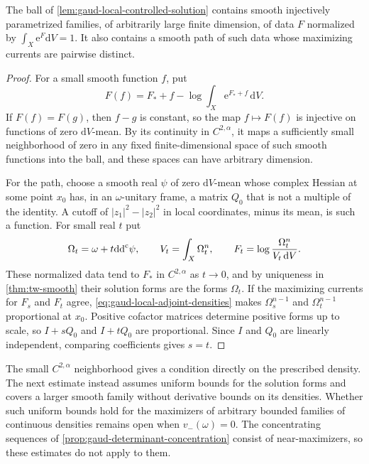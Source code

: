 \begin{corollary}\label{cor:gaud-local-density-family}
The ball of \cref{lem:gaud-local-controlled-solution} contains smooth injectively parametrized families, of arbitrarily large finite dimension, of data $F$ normalized by $\int_X\mathrm{e}^F\mathrm{d}V=1$. It also contains a smooth path of such data whose maximizing currents are pairwise distinct.
\end{corollary}
\begin{proof}
For a small smooth function $f$, put
\[
 F(f)=F_*+f-\log\int_X\mathrm{e}^{F_*+f}\,\mathrm{d}V.
\]
If $F(f)=F(g)$, then $f-g$ is constant, so the map $f\mapsto F(f)$ is injective on functions of zero $\mathrm{d}V$-mean. By its continuity in $C^{2,\alpha}$, it maps a sufficiently small neighborhood of zero in any fixed finite-dimensional space of such smooth functions into the ball, and these spaces can have arbitrary dimension.

For the path, choose a smooth real $\psi$ of zero $\mathrm{d}V$-mean whose complex Hessian at some point $x_0$ has, in an $\omega$-unitary frame, a matrix $Q_0$ that is not a multiple of the identity. A cutoff of $|z_1|^2-|z_2|^2$ in local coordinates, minus its mean, is such a function. For small real $t$ put
\[
 \Omega_t=\omega+t\mathrm{dd}^{\mathrm{c}}\psi,\qquad
 V_t=\int_X\Omega_t^n,\qquad
 F_t=\log\frac{\Omega_t^n}{V_t\,\mathrm{d}V}.
\]
These normalized data tend to $F_*$ in $C^{2,\alpha}$ as $t\to0$, and by uniqueness in \cref{thm:tw-smooth} their solution forms are the forms $\Omega_t$. If the maximizing currents for $F_s$ and $F_t$ agree, \eqref{eq:gaud-local-adjoint-densities} makes $\Omega_s^{n-1}$ and $\Omega_t^{n-1}$ proportional at $x_0$. Positive cofactor matrices determine positive forms up to scale, so $I+sQ_0$ and $I+tQ_0$ are proportional. Since $I$ and $Q_0$ are linearly independent, comparing coefficients gives $s=t$.
\end{proof}

The small $C^{2,\alpha}$ neighborhood gives a condition directly on the prescribed density. The next estimate instead assumes uniform bounds for the solution forms and covers a larger smooth family without derivative bounds on its densities. Whether such uniform bounds hold for the maximizers of arbitrary bounded families of continuous densities remains open when $v_-(\omega)=0$. The concentrating sequences of \cref{prop:gaud-determinant-concentration} consist of near-maximizers, so these estimates do not apply to them.
